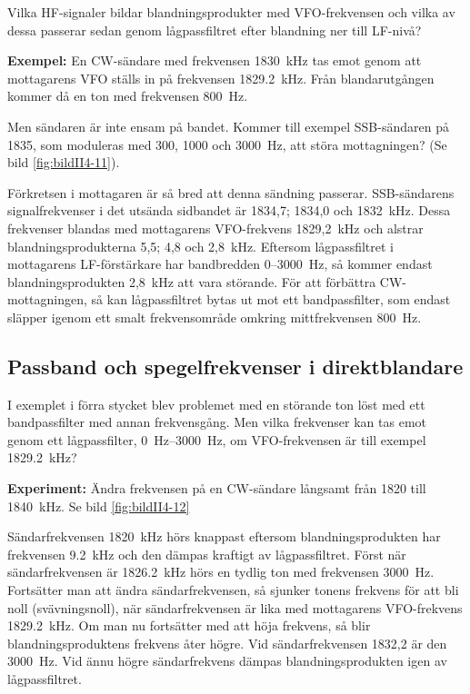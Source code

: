 Vilka HF-signaler bildar blandningsprodukter med VFO-frekvensen och
vilka av dessa passerar sedan genom lågpassfiltret efter blandning ner
till LF-nivå?

\textbf{Exempel:}
En CW-sändare med frekvensen \SI{1830}{\kilo\hertz} tas emot genom att
mottagarens VFO ställs in på frekvensen \SI{1829,2}{\kilo\hertz}.
Från blandarutgången kommer då en ton med frekvensen \SI{800}{\hertz}.

Men sändaren är inte ensam på bandet.
Kommer till exempel SSB-sändaren på 1835, som moduleras med 300, 1000 och
\SI{3000}{\hertz}, att störa mottagningen?
(Se bild \ref{fig:bildII4-11}).

Förkretsen i mottagaren är så bred att denna sändning passerar.
SSB-sändarens signalfrekvenser i det utsända sidbandet är 1834,7; 1834,0 och
\SI{1832}{\kilo\hertz}.
Dessa frekvenser blandas med mottagarens VFO-\-frekvens 1829,2~kHz och alstrar
blandningsprodukterna 5,5; 4,8 och 2,8~kHz.
Eftersom lågpassfiltret i mottagarens LF-förstärkare har bandbredden
0--3000~Hz, så kommer endast blandningsprodukten 2,8~kHz att vara störande.
För att förbättra CW-mottagningen, så kan lågpassfiltret bytas ut mot ett
bandpassfilter, som endast släpper igenom ett smalt frekvensområde omkring
mittfrekvensen \SI{800}{\hertz}.

\subsection{Passband och spegelfrekvenser i direktblandare}

I exemplet i förra stycket blev problemet med en störande ton löst med
ett bandpassfilter med annan frekvensgång.
Men vilka frekvenser kan tas emot genom ett lågpassfilter,
\SIrange{0}{3000}{\hertz}, om VFO-frekvensen är till exempel
\SI{1829,2}{\kilo\hertz}?

\textbf{Experiment:}
Ändra frekvensen på en CW-sändare långsamt från 1820 till
\SI{1840}{\kilo\hertz}.
Se bild \ref{fig:bildII4-12}

Sändarfrekvensen \SI{1820}{\kilo\hertz} hörs knappast eftersom
blandningsprodukten har frekvensen \SI{9,2}{\kilo\hertz} och den dämpas kraftigt
av lågpassfiltret.
Först när sändarfrekvensen är \SI{1826,2}{\kilo\hertz} hörs en tydlig ton med
frekvensen \SI{3000}{\hertz}.
Fortsätter man att ändra sändarfrekvensen, så sjunker tonens frekvens för att
bli noll (svävningsnoll), när sändarfrekvensen är lika med mottagarens
VFO-frekvens \SI{1829,2}{\kilo\hertz}.
Om man nu fortsätter med att höja frekvens, så blir blandningsproduktens
frekvens åter högre.
Vid sändarfrekvensen 1832,2 är den \SI{3000}{\hertz}.
Vid ännu högre sändarfrekvens dämpas blandningsprodukten igen av lågpassfiltret.

